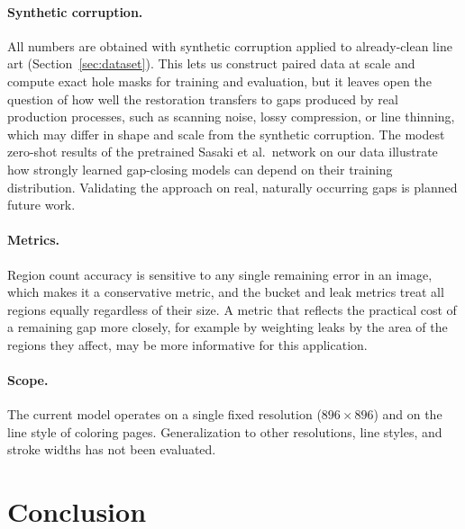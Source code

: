 \documentclass[pdflatex,sn-mathphys-num]{sn-jnl}%
\begin{document}
\paragraph{Synthetic corruption.} All numbers are obtained with synthetic corruption
applied to already-clean line art (Section~\ref{sec:dataset}). This lets us construct
paired data at scale and compute exact hole masks for training and evaluation, but it
leaves open the question of how well the restoration transfers to gaps produced by
real production processes, such as scanning noise, lossy compression, or line
thinning, which may differ in shape and scale from the synthetic corruption. The
modest zero-shot results of the pretrained Sasaki et al.\ network on our data
illustrate how strongly learned gap-closing models can depend on their training
distribution. Validating the approach on real, naturally occurring gaps is planned
future work.

\paragraph{Metrics.} Region count accuracy is sensitive to any single remaining
error in an image, which makes it a conservative metric, and the bucket and leak
metrics treat all regions equally regardless of their size. A metric that reflects
the practical cost of a remaining gap more closely, for example by weighting leaks by
the area of the regions they affect, may be more informative for this application.

\paragraph{Scope.} The current model operates on a single fixed resolution
($896\times 896$) and on the line style of coloring pages. Generalization to other
resolutions, line styles, and stroke widths has not been evaluated.

\section{Conclusion}
\end{document}
